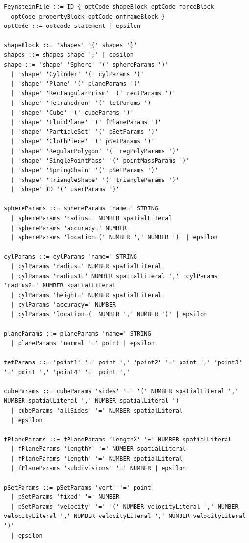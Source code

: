 \begin{verbatim}
FeynsteinFile ::= ID { optCode shapeBlock optCode forceBlock 
  optCode propertyBlock optCode onframeBlock }
optCode ::= optcode statement | epsilon

shapeBlock ::= 'shapes' '{' shapes '}'
shapes ::= shapes shape ';' | epsilon
shape ::= 'shape' 'Sphere' '(' sphereParams ')' 
  | 'shape' 'Cylinder' '(' cylParams ')' 
  | 'shape' 'Plane' '(' planeParams ')' 
  | 'shape' 'RectangularPrism' '(' rectParams ')' 
  | 'shape' 'Tetrahedron' '(' tetParams ') 
  | 'shape' 'Cube' '(' cubeParams ')'
  | 'shape' 'FluidPlane' '(' fPlaneParams ')'
  | 'shape' 'ParticleSet' '(' pSetParams ')'
  | 'shape' 'ClothPiece' '(' pSetParams ')'
  | 'shape' 'RegularPolygon' '(' regPolyParams ')'
  | 'shape' 'SinglePointMass' '(' pointMassParams ')'
  | 'shape' 'SpringChain' '(' pSetParams ')'
  | 'shape' 'TriangleShape' '(' triangleParams ')'
  | 'shape' ID '(' userParams ')' 

sphereParams ::= sphereParams 'name=' STRING 
  | sphereParams 'radius=' NUMBER spatialLiteral 
  | sphereParams 'accuracy=' NUMBER
  | sphereParams 'location=(' NUMBER ',' NUMBER ')' | epsilon

cylParams ::= cylParams 'name=' STRING 
  | cylParams 'radius=' NUMBER spatialLiteral 
  | cylParams 'radius1=' NUMBER spatialLiteral ','  cylParams 'radius2=' NUMBER spatialLiteral 
  | cylParams 'height=' NUMBER spatialLiteral 
  | cylParams 'accuracy=' NUMBER
  | cylParams 'location=(' NUMBER ',' NUMBER ')' | epsilon

planeParams ::= planeParams 'name=' STRING 
  | planeParams 'normal '=' point | epsilon

tetParams ::= 'point1' '=' point ',' 'point2' '=' point ',' 'point3' '=' point ',' 'point4' '=' point ','

cubeParams ::= cubeParams 'sides' '=' '(' NUMBER spatialLiteral ',' NUMBER spatialLiteral ',' NUMBER spatialLiteral ')'
  | cubeParams 'allSides' '=' NUMBER spatialLiteral
  | epsilon 

fPlaneParams ::= fPlaneParams 'lengthX' '=' NUMBER spatialLiteral
  | fPlaneParams 'lengthY' '=' NUMBER spatialLiteral
  | fPlaneParams 'length' '=' NUMBER spatialLiteral
  | fPlaneParams 'subdivisions' '=' NUMBER | epsilon

pSetParams ::= pSetParams 'vert' '=' point 
  | pSetParams 'fixed' '=' NUMBER 
  | pSetParams 'velocity' '=' '(' NUMBER velocityLiteral ',' NUMBER velocityLiteral ',' NUMBER velocityLiteral ',' NUMBER velocityLiteral ')'
  | epsilon


\end{verbatim}
